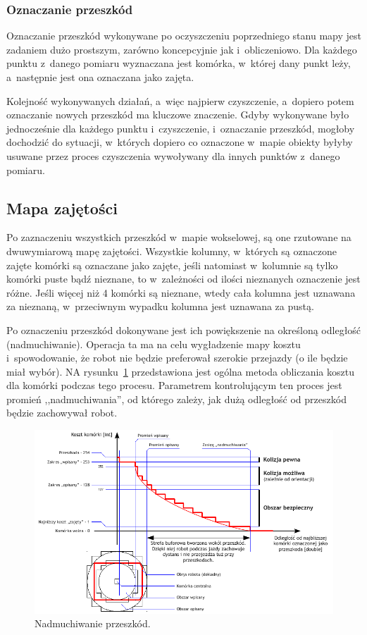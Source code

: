 \subsubsection{Oznaczanie przeszkód}

Oznaczanie przeszkód wykonywane po oczyszczeniu poprzedniego stanu mapy jest zadaniem
dużo prostszym, zarówno koncepcyjnie jak i~obliczeniowo. Dla każdego punktu z~danego
pomiaru wyznaczana jest komórka, w~której dany punkt leży, a~następnie jest ona
oznaczana jako zajęta.

Kolejność wykonywanych działań, a~więc najpierw czyszczenie, a~dopiero potem
oznaczanie nowych przeszkód ma kluczowe znaczenie. Gdyby wykonywane było jednocześnie
dla każdego punktu i~czyszczenie, i~oznaczanie przeszkód, mogłoby dochodzić do
sytuacji, w~których dopiero co oznaczone w~mapie obiekty byłyby usuwane przez proces
czyszczenia wywoływany dla innych punktów z~danego pomiaru.


\subsection{Mapa zajętości}

Po zaznaczeniu wszystkich przeszkód w~mapie wokselowej, są one rzutowane na
dwuwymiarową mapę zajętości. Wszystkie kolumny, w~których są oznaczone zajęte
komórki są oznaczane jako zajęte, jeśli natomiast w~kolumnie są tylko komórki
puste bądź nieznane, to w~zależności od ilości nieznanych oznaczenie jest różne.
Jeśli więcej niż 4 komórki są nieznane, wtedy cała kolumna jest uznawana za
nieznaną, w~przeciwnym wypadku kolumna jest uznawana za pustą.

Po oznaczeniu przeszkód dokonywane jest ich powiększenie na określoną odległość
(nadmuchiwanie). Operacja ta ma na celu wygładzenie mapy kosztu i~spowodowanie,
że robot nie będzie preferował szerokie przejazdy (o ile będzie miał wybór). NA
rysunku~\ref{fig:inflation} przedstawiona jest ogólna metoda obliczania kosztu
dla komórki podczas tego procesu. Parametrem kontrolującym ten proces jest
promień ,,nadmuchiwania'', od którego zależy, jak dużą odległość od
przeszkód będzie zachowywał robot.

\begin{figure}[htb!]
\centering
\includegraphics[width=15cm]{../../Common/img/ros/inflate.pdf}
\caption{Nadmuchiwanie przeszkód.}
\label{fig:inflation}
\end{figure}

